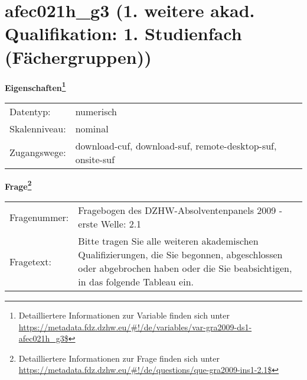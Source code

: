 
    \setcounter{footnote}{0}

    \vspace*{-1.8cm}
	\section{afec021h\_g3 (1. weitere akad. Qualifikation: 1. Studienfach (Fächergruppen))}
	\label{section:afec021h_g3}



    \vspace*{0.5cm}
    \noindent\textbf{Eigenschaften\footnote{Detailliertere Informationen zur Variable finden sich unter
		\url{https://metadata.fdz.dzhw.eu/\#!/de/variables/var-gra2009-ds1-afec021h_g3$}}}\\
	\begin{tabularx}{\hsize}{@{}lX}
	Datentyp: & numerisch \\
	Skalenniveau: & nominal \\
	Zugangswege: &
	  download-cuf, 
	  download-suf, 
	  remote-desktop-suf, 
	  onsite-suf
 \\
    \end{tabularx}



				\vspace*{0.5cm}
                \noindent\textbf{Frage\footnote{Detailliertere Informationen zur Frage finden sich unter
		              \url{https://metadata.fdz.dzhw.eu/\#!/de/questions/que-gra2009-ins1-2.1$}}}\\
				\begin{tabularx}{\hsize}{@{}lX}
					Fragenummer: &
					  Fragebogen des DZHW-Absolventenpanels 2009 - erste Welle:
					  2.1
 \\
					Fragetext: & Bitte tragen Sie alle weiteren akademischen Qualifizierungen, die Sie begonnen, abgeschlossen oder abgebrochen haben oder die Sie beabsichtigen, in das folgende Tableau ein. \\
				\end{tabularx}






